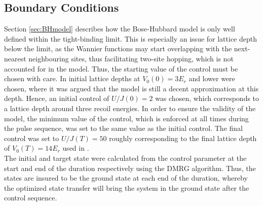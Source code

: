 \subsection{Boundary Conditions}
Section \ref{sec:BHmodel} describes how the Bose-Hubbard model is only well defined within the tight-binding limit. This is especially an issue for lattice depth below the limit, as the Wannier functions may start overlapping with the next-nearest neighbouring sites, thus facilitating two-site hopping, which is not accounted for in the model. Thus, the starting value of the control must be chosen with care. In \cite{FrankBloch,Doria2011} initial lattice depths at $V_0 (0) = 3 E_r$ and lower were chosen, where it was argued that the model is still a decent approximation at this depth. Hence, an initial control of $U/J (0) = 2$ was chosen, which corresponds to a lattice depth around three recoil energies. In order to ensure the validity of the model, the minimum value of the control, which is enforced at all times during the pulse sequence, was set to the same value as the initial control.  
The final control was set to $U/J (T) = 50$ roughly corresponding to the final lattice depth of $V_0 (T) = 14 E_r$ used in \cite{FrankBloch}.\\
The initial and target state were calculated from the control parameter at the start and end of the duration respectively using the DMRG algorithm. Thus, the states are insured to be the ground state at each end of the duration, whereby the optimized state transfer will bring the system in the ground state after the control sequence.


